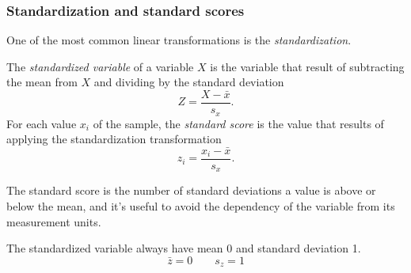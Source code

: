 % 
% 
% 
% 
% 
\begin{frame}
\frametitle{Standardization and standard scores}
One of the most common linear transformations is the \emph{standardization}.
\begin{definition}
The \emph{standardized variable} of a variable $X$ is the variable that result of subtracting the mean from $X$ and
dividing by the standard deviation 
\[
Z=\frac{X-\bar x}{s_{x}}.
\]
For each value $x_i$ of the sample, the \emph{standard score} is the value that results of applying the standardization
transformation
\[
z_i=\frac{x_i-\bar x}{s_{x}}.
\]
\end{definition}

The standard score is the number of standard deviations a value is above or below the mean, and it's useful to avoid
the dependency of the variable from its measurement units.

The standardized variable always have mean 0 and standard deviation 1.  
\[
\bar z = 0 \qquad s_{z} = 1
\]
\end{frame}



